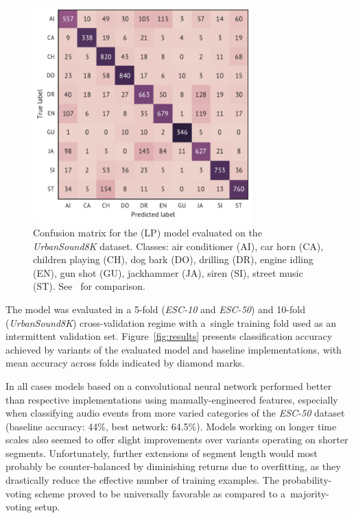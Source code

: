 \documentclass{article}
\begin{document}
\begin{figure}[!hb]
\vspace{-18pt}
\centering
\includegraphics[width=20pc]{Figures/Conf.pdf}
\vspace{-6pt}
\caption{\label{fig:confmatrix}Confusion matrix for the (LP) model evaluated on the \textit{UrbanSound8K} dataset. Classes: air conditioner (AI), car horn (CA), children playing (CH), dog bark (DO), drilling (DR), engine idling (EN), gun shot (GU), jackhammer (JA), siren (SI), street music (ST). See~\cite{salamon2015unsupervised} for comparison.}
\end{figure}

The model was evaluated in a 5-fold (\textit{ESC-10} and \textit{ESC-50}) and 10-fold (\textit{UrbanSound8K}) cross-validation regime with a~single training fold used as an intermittent validation set. Figure~\ref{fig:results} presents classification accuracy achieved by variants of the evaluated model and baseline implementations, with mean accuracy across folds indicated by diamond marks.


In all cases models based on a convolutional neural network performed better than respective implementations using manually-engineered features, especially when classifying audio events from more varied categories of the \textit{ESC-50} dataset (baseline accuracy: 44\%, best network: 64.5\%). Models working on longer time scales also seemed to offer slight improvements over variants operating on shorter segments. Unfortunately, further extensions of segment length would most probably be counter-balanced by diminishing returns due to overfitting, as they drastically reduce the effective number of training examples. The probability-voting scheme proved to be universally favorable as compared to a~majority-voting setup.
\end{document}
